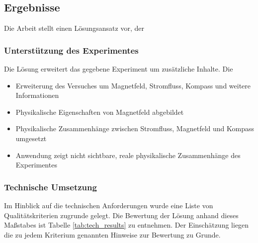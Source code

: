 \subsection{Ergebnisse}
Die Arbeit stellt einen Lösungsansatz vor, der 

\subsubsection{Unterstützung des Experimentes}
Die Lösung erweitert das gegebene Experiment um zusätzliche Inhalte. Die
\begin{itemize}
	\setlength{\itemsep}{-1pt}
	\singlespacing
	\item Erweiterung des Versuches um Magnetfeld, Stromfluss, Kompass und weitere Informationen
	\item Physikalische Eigenschaften von Magnetfeld abgebildet
	\item Physikalische Zusammenhänge zwischen Stromfluss, Magnetfeld und Kompass umgesetzt
	\item Anwendung zeigt nicht sichtbare, reale physikalische Zusammenhänge des Experimentes
\end{itemize}

\subsubsection{Technische Umsetzung}
Im Hinblick auf die technischen Anforderungen wurde eine Liste von Qualitätskriterien zugrunde gelegt. Die Bewertung der Lösung anhand dieses Maßstabes ist Tabelle \ref{tab:tech_results} zu entnehmen. Der Einschätzung liegen die zu jedem Kriterium genannten Hinweise zur Bewertung zu Grunde.\\

